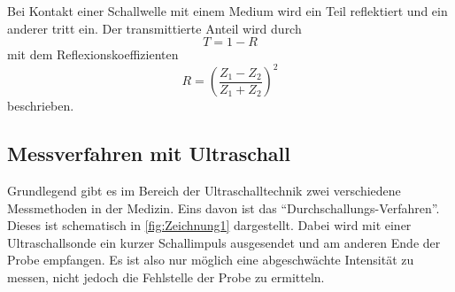 Bei Kontakt einer Schallwelle mit einem Medium wird ein Teil reflektiert und ein anderer tritt ein.
Der transmittierte Anteil wird durch
\begin{equation}
    T = 1 - R
\end{equation}
mit dem Reflexionskoeffizienten
\begin{equation}
    R = \left( \frac{Z_1 - Z_2}{Z_1 + Z_2} \right)^2
\end{equation}
beschrieben.

\subsection{Messverfahren mit Ultraschall}

Grundlegend gibt es im Bereich der Ultraschalltechnik zwei verschiedene Messmethoden in der Medizin.
Eins davon ist das \enquote{Durchschallungs-Verfahren}. Dieses ist schematisch in \autoref{fig:Zeichnung1} dargestellt.
Dabei wird mit einer Ultraschallsonde ein kurzer Schallimpuls ausgesendet und am anderen Ende der Probe empfangen.
Es ist also nur möglich eine abgeschwächte Intensität zu messen, nicht jedoch die Fehlstelle der Probe zu ermitteln. 

